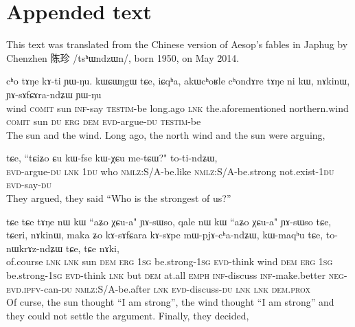 \documentclass[oldfontcommands,oneside,a4paper,11pt]{article}
\newcommand{\ipa}[1]{{\phon/#1/}} %
\newcommand{\ipab}[1]{{\phon#1}} %
\newcommand{\zh}[1]{{\cn #1}}
\begin{document}
         
     \section{Appended text}
     
   This text was translated from the Chinese version of Aesop's fables in Japhug by Chenzhen \zh{陈珍} \ipa{tsʰɯndzɯn}, born 1950, on May 2014. 
   
     \begin{exe} 
 \ex 
\gll  \ipab{qale} \ipab{cʰo} \ipab{tɤŋe} \ipab{kɤ-ti} \ipab{ɲɯ-ŋu.} \ipab{kɯɕɯŋgɯ} \ipab{tɕe,} \ipab{iɕqʰa,} \ipab{akɯcʰoʁle}   \ipab{cʰondɤre} \ipab{tɤŋe} \ipab{ni} \ipab{kɯ,} \ipab{nɤkinɯ,} \ipab{ɲɤ-sɤfɕɤra-ndʑɯ} \ipab{ɲɯ-ŋu} \\ 
 wind \textsc{comit} sun    \textsc{inf}-say \textsc{testim}-be   long.ago     \textsc{lnk}  the.aforementioned northern.wind  \textsc{comit}     sun    \textsc{du}  \textsc{erg} \textsc{dem}      \textsc{evd}-argue-\textsc{du}    \textsc{testim}-be\\ 
 \glt  The sun and the wind. Long ago, the north wind and the sun were arguing,
\end{exe} 

 

\begin{exe} 
 \ex 
\gll  \ipab{ɲɤ-sɤfɕɤra-ndʑɯ} \ipab{tɕe,} \ipab{``tɕiʑo} \ipab{ɕu} \ipab{kɯ-fse} \ipab{kɯ-χɕu} \ipab{me-tɕɯ?"} \ipab{to-ti-ndʑɯ,} \\ 
 \textsc{evd}-argue-\textsc{du}    \textsc{lnk}  1\textsc{du}     who \textsc{nmlz}:S/A-be.like \textsc{nmlz}:S/A-be.strong not.exist-1\textsc{du}  \textsc{evd}-say-\textsc{du}\\ 
 \glt  They argued, they said ``Who is the strongest of us?''
\end{exe} 

\begin{exe} 
 \ex 
\gll  \ipab{lɯski} \ipab{tɕe} \ipab{tɕe} \ipab{tɤŋe} \ipab{nɯ} \ipab{kɯ} \ipab{``aʑo} \ipab{χɕu-a"} \ipab{ɲɤ-sɯso,} \ipab{qale} \ipab{nɯ} \ipab{kɯ} \ipab{``aʑo}  \ipab{χɕu-a"} \ipab{ɲɤ-sɯso} \ipab{tɕe,} \ipab{tɕeri,} \ipab{nɤkinɯ,} \ipab{maka} \ipab{ʑo} \ipab{kɤ-sɤfɕara} \ipab{kɤ-sɤpe} \ipab{mɯ-pjɤ-cʰa-ndʑɯ,} \ipab{kɯ-maqʰu} \ipab{tɕe,} \ipab{to-nɯkrɤz-ndʑɯ} \ipab{tɕe,} \ipab{tɕe} \ipab{nɤki,} \\ 
 of.course \textsc{lnk} \textsc{lnk} sun    \textsc{dem} \textsc{erg} 1\textsc{sg}  be.strong-1\textsc{sg} \textsc{evd}-think wind \textsc{dem} \textsc{erg} 1\textsc{sg}  be.strong-1\textsc{sg} \textsc{evd}-think \textsc{lnk}  but     \textsc{dem}      at.all \textsc{emph} \textsc{inf}-discuss   \textsc{inf}-make.better  \textsc{neg}-\textsc{evd}.\textsc{ipfv}-can-\textsc{du}    \textsc{nmlz}:S/A-be.after \textsc{lnk}  \textsc{evd}-discuss-\textsc{du}    \textsc{lnk}  \textsc{lnk} \textsc{dem}.\textsc{prox}\\ 
 \glt  Of curse, the sun thought ``I am strong'', the wind thought ``I am strong'' and they could not settle the argument. Finally, they decided,
\end{exe} 
 
\end{document}
